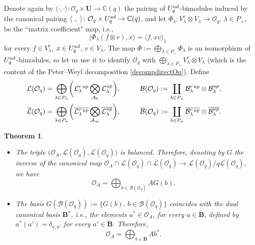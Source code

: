 \documentclass[11pt]{article}
\numberwithin{equation}{section}
\numberwithin{equation}{section}
\newtheorem{teo}{Theorem}[section]
\theoremstyle{definition}
\newcommand{\Oq}{\Oo_{q}}
\newcommand{\mc}{\mathbb{C}}
\newcommand{\Ll}{{\mathcal L}}
\newcommand{\Oo}{{\mathcal O}}
\newcommand{\ra}{\rightarrow}
\begin{document}
Denote again by $\langle\cdot,\cdot \rangle \colon \Oq \times \dot{\mathbf{U}} \ra \mc(q)$ the pairing of $U_q^{\rm ad}$-bimodules induced by the canonical pairing $\langle\ ,\ \rangle \colon \Oq \times U_q^{\rm ad} \ra \mc(q)$, and let $\Phi_\lambda\colon V_\lambda^r \otimes V_\lambda \ra \Oo_q$, $\lambda\in P_+$, be the ``matrix coefficient" map, i.e.,
\begin{equation}\label{pairingOAKashi}
\langle \Phi_\lambda (f \otimes v),x\rangle = \langle f, xv\rangle_\lambda
\end{equation}
for every $f\in V_\lambda^r$, $x\in U_q^{\rm ad}$, $v\in V_\lambda$. The map $\Phi := \bigoplus_{\lambda\in P_+} \Phi_\lambda$ is an isomorphism of $U_q^{\rm ad}$-bimodules, so let us use it to identify $\Oo_q$ with $\bigoplus_{\lambda\in P_+} V_\lambda^r \otimes V_\lambda$ (which is the content of the Peter--Weyl decomposition \eqref{decompdirectOq}). Define
\begin{alignat*}{3}
& \Ll(\Oo_q) = \bigoplus_{\lambda\in P_+} \biggl(\Ll_{\lambda}^r {}^{\rm up} \bigotimes_{\mathcal{A}_0} \Ll_{\lambda}^{\rm up}\biggr),\qquad && \mathcal{B}(\Oo_q) := \coprod_{\lambda\in P_+} \mathcal{B}_\lambda^r {}^{\rm up} \otimes \mathcal{B}_\lambda^{\rm up},& \\
& \overline{\Ll}(\Oo_q) = \bigoplus_{\lambda\in P_+} \biggl(\overline{\Ll_{\lambda}^r {}^{\rm up}} \bigotimes_{\mathcal{A}_\infty} \overline{\Ll_{\lambda}^{\rm up}}\biggr),\qquad && \overline{\mathcal{B}}(\Oo_q) := \coprod_{\lambda\in P_+} \overline{\mathcal{B}_\lambda^r {}^{\rm up}} \otimes \overline{\mathcal{B}_\lambda^{\rm up}}.&
\end{alignat*}
\begin{teo}\label{canKashi} \quad
\begin{itemize}\itemsep=0pt
\item[$(i)$] The triple $\big(\Oo_A,\Ll(\Oo_q),\overline{\Ll}(\Oo_q)\big)$ is balanced. Therefore, denoting by $G$ the inverse of the canonical map $\Oo_A \cap \Ll(\Oo_q) \cap \overline{\Ll}(\Oo_q)\ra \Ll(\Oo_q)/q\Ll(\Oo_q)$, we have
\[\Oo_A = \bigoplus_{b\in \mathcal{B}(\Oo_q)} A G(b).\]
\item[$(ii)$] The basis $G(\mathcal{B}(\Oo_q)):=\{G(b), \, b\in \mathcal{B}(\Oo_q)\}$ coincides with the dual canonical basis $\dot{\mathbf{B}} {}^*$, i.e., the elements $a^* \in \Oo_A$, for every $a\in \dot{\mathbf{B}}$, defined by $a^* (a') = \delta_{a,a'}$ for every $a'\in \dot{\mathbf{B}}$. Therefore, \[\Oo_A = \bigoplus_{b\in \dot{\mathbf{B}}} Ab^*.\]
\end{itemize}
\end{teo}
\end{document}

